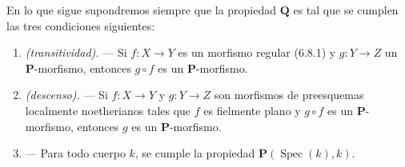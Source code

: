 \begin{env}[7.3.4]
\label{IV.2.s7.3.4-fr}
En lo que sigue supondremos siempre que la propiedad $\boldsymbol Q$
es tal que se cumplen las tres condiciones siguientes:
\begin{enumerate}
\item[$(\mathrm P_{\mathrm I})$] \emph{(transitividad).} --- Si
$f:X\to Y$ es un morfismo regular (6.8.1) y $g:Y\to Z$ un
$\boldsymbol P$-morfismo, entonces $g\circ f$ es un
$\boldsymbol P$-morfismo.
\item[$(\mathrm P_{\mathrm{II}})$] \emph{(descenso).} --- Si
$f:X\to Y$ y $g:Y\to Z$ son morfismos de preesquemas localmente
noetherianos tales que $f$ es fielmente plano y $g\circ f$ es un
$\boldsymbol P$-morfismo, entonces $g$ es un
$\boldsymbol P$-morfismo.
\item[$(\mathrm P_{\mathrm{III}})$.] --- Para todo cuerpo $k$, se cumple
la propiedad $\boldsymbol P(\operatorname{Spec}(k),k)$.
\end{enumerate}
\end{env}
